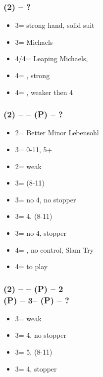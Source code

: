 \subsubsection*{(2\hearts) -- ?}
\begin{itemize}
    \item 3\spades = strong hand, solid suit
    \item 3\hearts = Michaels
    \item 4\clubs/4\diams = Leaping Michaels, \gf
    \item 4\hearts = \minor, strong \vimp
    \item 4\nt = \minor, weaker then 4\hearts
\end{itemize}

\subsubsection*{(2\hearts) -- \dbl -- (P) -- ?}
\begin{itemize}
    \item 2\nt = Better Minor Lebensohl
    \item 3\clubs = 0-11, 5+\clubs
    \item 2\spades = weak
    \item 3\diams = \inv (8-11)
    \item 3\hearts = no 4\spades, no \hearts stopper
    \item 3\spades = 4\spades, \inv (8-11) \imp
    \item 3\nt = no 4\spades, \hearts stopper
    \item 4\hearts = \minor, no \hearts control, Slam Try \vimp
    \item 4\spades = to play
\end{itemize}

\subsubsection*{(2\hearts) -- \dbl -- (P) -- 2\nt \\
                (P) -- 3\minor -- (P) -- ?}
\begin{itemize}
    \item 3\diams = weak
    \item 3\hearts = 4\spades, no \hearts stopper
    \item 3\spades = 5\spades, \inv (8-11) \imp
    \item 3\nt = 4\spades, \hearts stopper
\end{itemize}

